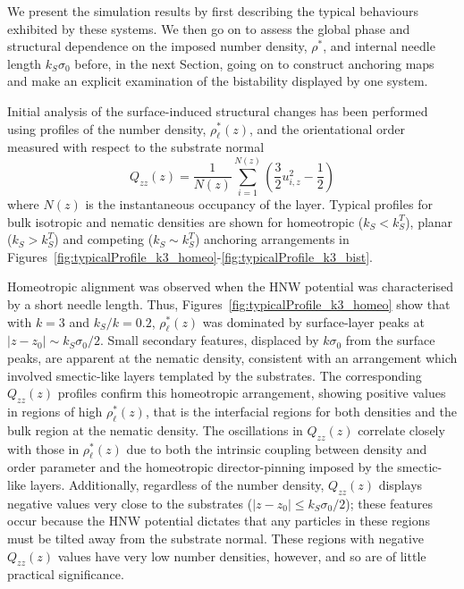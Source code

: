 \documentclass[aps,10pt,twocolumn]{revtex4}
\newcommand{\so}{\sigma_0}
\begin{document}
We present the simulation results by first describing the typical behaviours exhibited by these systems. We then
go on to assess the global phase and structural dependence on the imposed number density, $\rho^*$, and internal
needle length $k_S \so$ before, in the next Section, going on to construct anchoring maps and make an
explicit examination of the bistability displayed by one system.

Initial analysis of the surface-induced structural changes has been performed using profiles of the number
density, $\rho^{*}_\ell(z)$, and the orientational order measured with respect to the substrate normal
\begin{equation}
Q_{zz}(z)=\frac{1}{N(z)}\sum_{i=1}^{N(z)} \left( \frac{3}{2}u_{i,z}^2 - \frac{1}{2} \right)
\end{equation}
where $N(z)$ is the instantaneous occupancy of the layer. Typical profiles for bulk isotropic and nematic
densities are shown for homeotropic ($k_S<k^T_S$), planar ($k_S>k^T_S$) and competing ($k_S\sim k^T_S$) anchoring
arrangements in Figures~\ref{fig:typicalProfile_k3_homeo}-\ref{fig:typicalProfile_k3_bist}.

Homeotropic alignment was observed when the HNW potential was characterised by a short needle length. Thus,
Figures~\ref{fig:typicalProfile_k3_homeo} show that with $k=3$ and $k_S/k = 0.2$, $\rho^{*}_\ell(z)$ was dominated
by surface-layer peaks at $|z-z_0|\sim k_S \so / 2$. Small secondary features, displaced by $k\so$ from the
surface peaks, are apparent at the nematic density, consistent with an arrangement which involved smectic-like
layers templated by the substrates. The corresponding $Q_{zz}(z)$ profiles confirm this homeotropic arrangement,
showing positive values in regions of high $\rho^{*}_\ell(z)$, that is the interfacial regions for both densities
and the bulk region at the nematic density. The oscillations in $Q_{zz}(z)$ correlate closely with those in
$\rho^{*}_\ell(z)$ due to both the intrinsic coupling between density and order parameter and the homeotropic
director-pinning imposed by the smectic-like layers. Additionally, regardless of the number density, $Q_{zz}(z)$
displays negative values very close to the substrates ($|z-z_0|\leq k_S \so/{2}$); these features occur because
the HNW potential dictates that any particles in these regions must be tilted away from the substrate normal.
These regions with negative $Q_{zz}(z)$ values have very low number densities, however, and so are of little
practical significance.
\end{document}
